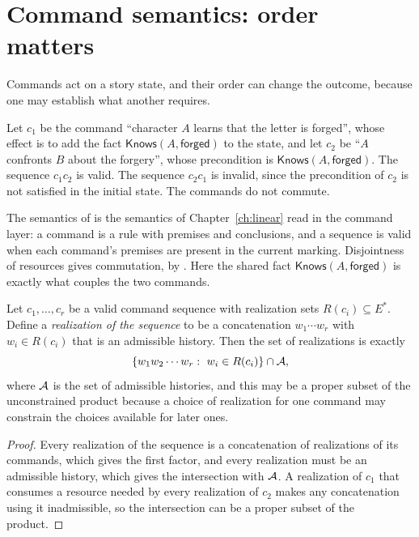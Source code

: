 \section{Command semantics: order matters}

Commands act on a story state, and their order can change the outcome, because one may establish what another requires.

\begin{example}\label{ex:noncomm}
Let $c_1$ be the command ``character $A$ learns that the letter is forged'', whose effect is to add the fact $\mathsf{Knows}(A,\mathsf{forged})$ to the state, and let $c_2$ be ``$A$ confronts $B$ about the forgery'', whose precondition is $\mathsf{Knows}(A,\mathsf{forged})$. The sequence $c_1c_2$ is valid. The sequence $c_2c_1$ is invalid, since the precondition of $c_2$ is not satisfied in the initial state. The commands do not commute.
\end{example}

The semantics of  is the semantics of Chapter~\ref{ch:linear} read in the command layer: a command is a rule with premises and conclusions, and a sequence is valid when each command's premises are present in the current marking. Disjointness of resources gives commutation, by . Here the shared fact $\mathsf{Knows}(A,\mathsf{forged})$ is exactly what couples the two commands.

\begin{proposition}\label{prop:realize}
Let $c_1,\dots,c_r$ be a valid command sequence with realization sets $R(c_i)\subseteq E^*$. Define a \emph{realization of the sequence} to be a concatenation $w_1\cdots w_r$ with $w_i\in R(c_i)$ that is an admissible history. Then the set of realizations is exactly
\[
\{w_1w_2\cdots w_r:\ w_i\in R(c_i)\}\cap\mathcal{A},
\]
where $\mathcal{A}$ is the set of admissible histories, and this may be a proper subset of the unconstrained product because a choice of realization for one command may constrain the choices available for later ones.
\end{proposition}

\begin{proof}
Every realization of the sequence is a concatenation of realizations of its commands, which gives the first factor, and every realization must be an admissible history, which gives the intersection with $\mathcal{A}$. A realization of $c_1$ that consumes a resource needed by every realization of $c_2$ makes any concatenation using it inadmissible, so the intersection can be a proper subset of the product.
\end{proof}

